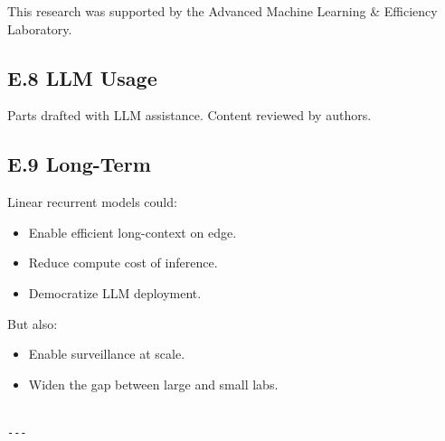 This research was supported by the Advanced Machine Learning \& Efficiency Laboratory.

\subsection{E.8 LLM Usage}

Parts drafted with LLM assistance. Content reviewed by authors.

\subsection{E.9 Long-Term}

Linear recurrent models could:
\begin{itemize}
\item Enable efficient long-context on edge.
\item Reduce compute cost of inference.
\item Democratize LLM deployment.

\end{itemize}
But also:
\begin{itemize}
\item Enable surveillance at scale.
\item Widen the gap between large and small labs.
\end{itemize}
\begin{lstlisting}

---
\end{lstlisting}

